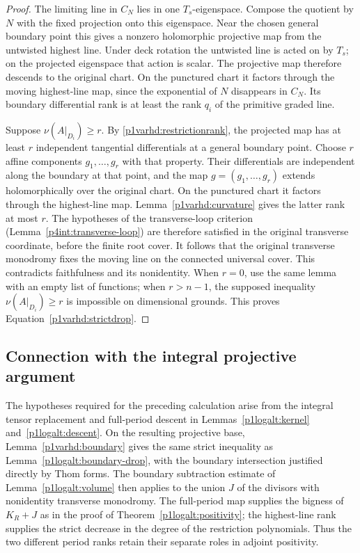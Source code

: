 \begin{proof}
The limiting line in $C_N$ lies in one $T_s$-eigenspace.  Compose
the quotient by $N$ with the fixed projection onto this eigenspace.
Near the chosen general boundary point this gives a nonzero
holomorphic projective map from the untwisted highest line.
Under deck rotation the untwisted line is acted on by $T_s$;
on the projected eigenspace that action is scalar.  The projective
map therefore descends to the original chart.  On the punctured
chart it factors through the moving highest-line map, since the
exponential of $N$ disappears in $C_N$.  Its boundary differential
rank is at least the rank $q_i$ of the primitive graded line.

Suppose $\nu(A|_{D_i})\geq r$.  By
\eqref{p1varhd:restrictionrank}, the projected map has at least $r$
independent tangential differentials at a general boundary point.
Choose $r$ affine components $g_1,\ldots,g_r$ with that property.
Their differentials are independent along the boundary at that point,
and the map $g=(g_1,\ldots,g_r)$ extends holomorphically over the original
chart.  On the punctured chart it factors through the highest-line map.
Lemma~\ref{p1varhd:curvature} gives the latter rank at most $r$.
The hypotheses of the transverse-loop criterion
(Lemma~\ref{p4int:transverse-loop}) are therefore satisfied in the
original transverse coordinate, before the finite root cover.  It
follows that the original transverse monodromy fixes the moving line
on the connected universal cover.  This contradicts faithfulness and
its nonidentity.  When $r=0$, use the same lemma with an empty list of
functions; when $r>n-1$, the supposed inequality
$\nu(A|_{D_i})\geq r$ is impossible on dimensional grounds.  This proves
Equation~\eqref{p1varhd:strictdrop}.
\end{proof}


\subsection{Connection with the integral projective argument}

The hypotheses required for the preceding calculation arise from the
integral tensor replacement and full-period descent in
Lemmas~\ref{p1logalt:kernel} and~\ref{p1logalt:descent}.
On the resulting projective base, Lemma~\ref{p1varhd:boundary} gives the
same strict inequality as Lemma~\ref{p1logalt:boundary-drop}, with
the boundary intersection justified directly by Thom forms.  The
boundary subtraction estimate of Lemma~\ref{p1logalt:volume} then
applies to the union $J$ of the divisors with nonidentity transverse
monodromy.  The full-period map supplies the bigness of $K_R+J$ as in
the proof of Theorem~\ref{p1logalt:positivity}; the highest-line
rank supplies the strict decrease in the degree of the restriction
polynomials.  Thus the two different period ranks retain their separate
roles in adjoint positivity.

